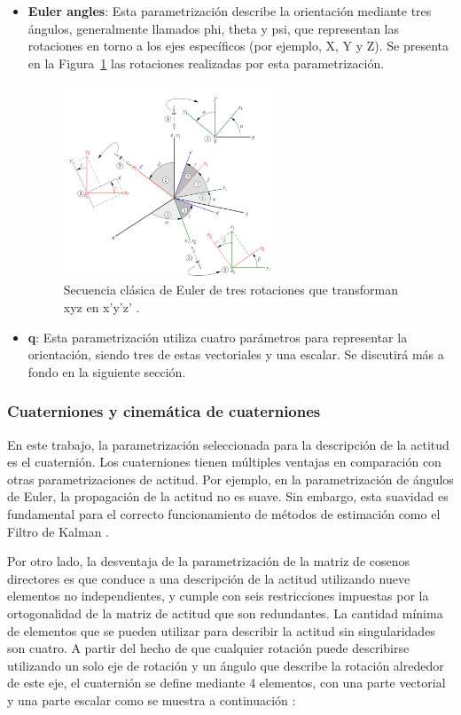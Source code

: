 \begin{itemize}
	\item \textbf{Euler angles}: Esta parametrización describe la orientación mediante tres ángulos, generalmente llamados \gls{phi}, \gls{theta} y \gls{psi}, que representan las rotaciones en torno a los ejes específicos (por ejemplo, X, Y y Z). Se presenta en la Figura~\ref{fig:euler_angles} las rotaciones realizadas por esta parametrización. 
	
	\begin{figure}[H]
		\centering    
		\includegraphics[width=0.6\textwidth]{euler_angles.png}
		\caption{Secuencia clásica de Euler de tres rotaciones que transforman xyz en x’y’z’ \cite{ref22}.}
		\label{fig:euler_angles}
	\end{figure}
	
	\item \textbf{\gls{q}}: Esta parametrización utiliza cuatro parámetros para representar la orientación, siendo tres de estas vectoriales y una escalar. Se discutirá más a fondo en la siguiente sección. 			
\end{itemize}

\subsubsection{Cuaterniones y cinemática de cuaterniones}

En este trabajo, la parametrización seleccionada para la descripción de la actitud es el cuaternión. Los cuaterniones tienen múltiples ventajas en comparación con otras parametrizaciones de actitud. Por ejemplo, en la parametrización de ángulos de Euler, la propagación de la actitud no es suave. Sin embargo, esta suavidad es fundamental para el correcto funcionamiento de métodos de estimación como el Filtro de Kalman \cite{ref23}.

Por otro lado, la desventaja de la parametrización de la matriz de cosenos directores es que conduce a una descripción de la actitud utilizando nueve elementos no independientes, y cumple con seis restricciones impuestas por la ortogonalidad de la matriz de actitud que son redundantes.
La cantidad mínima de elementos que se pueden utilizar para describir la actitud sin singularidades son cuatro. A partir del hecho de que cualquier rotación puede describirse utilizando un solo eje de rotación y un ángulo que describe la rotación alrededor de este eje, el cuaternión se define mediante 4 elementos, con una parte vectorial y una parte escalar como se muestra a continuación \cite{ref22}:

